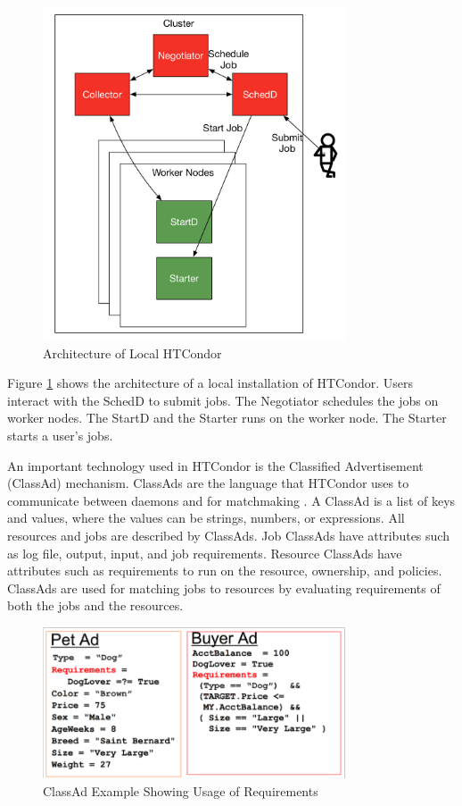 \begin{figure}[h!t]
	\centering
	\includegraphics[width=0.8\textwidth]{images/HTCondorArch.pdf}
	\caption{Architecture of Local HTCondor}
	\label{fig:htcondorarch}
\end{figure}

Figure \ref{fig:htcondorarch} shows the architecture of a local installation of HTCondor.  Users interact with the SchedD to submit jobs.  The Negotiator schedules the jobs on worker nodes.  The StartD and the Starter runs on the worker node.  The Starter starts a user's jobs.

An important technology used in HTCondor is the Classified Advertisement (\mbox{ClassAd}) mechanism.  ClassAds are the language that HTCondor uses to communicate between daemons and for matchmaking \cite{raman1998matchmaking}.  A ClassAd is a list of keys and values, where the values can be strings, numbers, or expressions.  All resources and jobs are described by ClassAds.  Job ClassAds have attributes such as log file, output, input, and job requirements.  Resource ClassAds have attributes such as  requirements to run on the resource, ownership, and policies.  ClassAds are used for matching jobs to resources by evaluating requirements of both the jobs and the resources.

\begin{figure}[h!t]
	\centering
	\includegraphics[width=0.8\textwidth]{images/ClassAdExample.png}
	\caption{ClassAd Example Showing Usage of Requirements}
	\label{fig:classadexample}
\end{figure}

